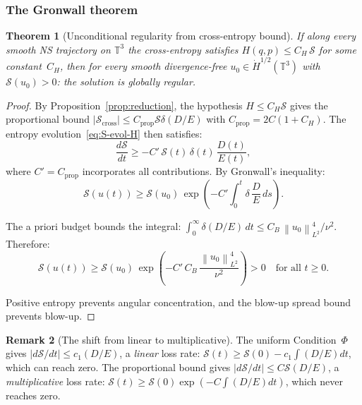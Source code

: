\documentclass[11pt]{article}
\newtheorem{theorem}{Theorem}[section]
\theoremstyle{definition}
\newtheorem{remark}[theorem]{Remark}
\newcommand{\T}{\mathbb{T}}
\newcommand{\norm}[1]{\left\| #1 \right\|}
\newcommand{\Hdot}[1]{\dot{H}^{#1}}
\newcommand{\cS}{\mathcal{S}}
\begin{document}
\subsubsection{The Gronwall theorem}

\begin{theorem}[Unconditional regularity from cross-entropy bound]
\label{thm:gronwall}
If along every smooth NS trajectory on $\T^3$ the
cross-entropy satisfies $H(q,p) \leq C_H\,\cS$
for some constant~$C_H$, then for every smooth
divergence-free $u_0 \in \Hdot{1/2}(\T^3)$ with
$\cS(u_0) > 0$:
the solution is globally regular.
\end{theorem}

\begin{proof}
By Proposition~\ref{prop:reduction}, the hypothesis
$H \leq C_H\cS$ gives the proportional bound
$|\cS_{\mathrm{cross}}| \leq C_{\mathrm{prop}}\cS\delta(D/E)$
with $C_{\mathrm{prop}} = 2C(1+C_H)$.
The entropy evolution~\eqref{eq:S-evol-H} then
satisfies:
\begin{equation}
\frac{d\cS}{dt}
\geq -C'\,\cS(t)\,\delta(t)\,\frac{D(t)}{E(t)},
\end{equation}
where $C' = C_{\mathrm{prop}}$ incorporates all
contributions.
By Gronwall's inequality:
\begin{equation}\label{eq:gronwall-bound}
\cS(u(t)) \geq \cS(u_0)\,
\exp\!\left(-C'\int_0^t
\delta\,\frac{D}{E}\,ds\right).
\end{equation}

The a priori budget bounds the integral:
$\int_0^\infty \delta(D/E)\,dt
\leq C_B\,\norm{u_0}_{L^2}^4/\nu^2$.
Therefore:
\begin{equation}
\cS(u(t)) \geq \cS(u_0)\,
\exp\!\left(-C'\,C_B\,
\frac{\norm{u_0}_{L^2}^4}{\nu^2}\right) > 0
\quad\text{for all } t \geq 0.
\end{equation}

Positive entropy prevents angular concentration,
and the blow-up spread bound prevents blow-up.
\end{proof}

\begin{remark}[The shift from linear to multiplicative]
The uniform Condition~$\Phi$ gives
$|d\cS/dt| \leq c_1(D/E)$, a \emph{linear}
loss rate: $\cS(t) \geq \cS(0) - c_1\int(D/E)dt$,
which can reach zero.
The proportional bound gives
$|d\cS/dt| \leq C\cS(D/E)$, a \emph{multiplicative}
loss rate: $\cS(t) \geq \cS(0)\exp(-C\int(D/E)dt)$,
which never reaches zero.
\end{remark}
\end{document}
